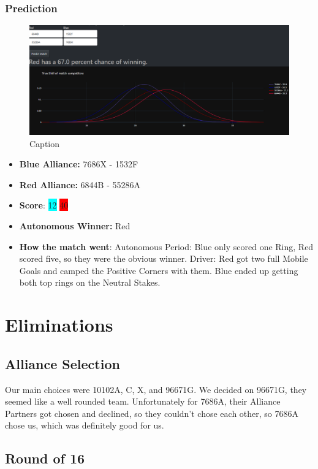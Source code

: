 \subsubsection*{Prediction}
\begin{figure}[H]
    \centering
    \includegraphics[width=0.8\linewidth]{images/Q94ND.png}
    \caption{Caption}
    \label{fig:enter-label}
\end{figure}
\begin{itemize}
    \item \textbf{Blue Alliance:} 7686X - 1532F
    \item \textbf{Red Alliance:} 6844B - 55286A
    \item \textbf{Score}: \colorbox{cyan}{12}
    \colorbox{red}{40}
    \item \textbf{Autonomous Winner:} Red
    \item \textbf{How the match went}: Autonomous Period: Blue only scored one Ring, Red scored five, so they were the obvious winner. Driver: Red got two full Mobile Goals and camped the Positive Corners with them. Blue ended up getting both top rings on the Neutral Stakes. 
\end{itemize}
\section*{Eliminations}
\subsection*{Alliance Selection}
Our main choices were 10102A, C, X, and 96671G. We decided on 96671G, they seemed like a well rounded team. Unfortunately for 7686A, their Alliance Partners got chosen and declined, so they couldn't chose each other, so 7686A chose us, which was definitely good for us.
\subsection*{Round of 16}

